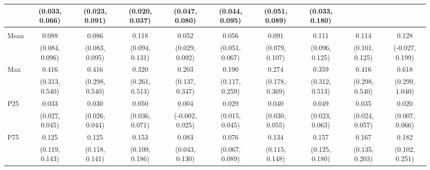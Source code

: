 {\begin{tabular}{l|c|c|c|c|c|c|c|c|c}
& {\scriptsize (0.033, 0.066)}
& {\scriptsize (0.023, 0.091)}
& {\scriptsize (0.020, 0.037)}
& {\scriptsize (0.047, 0.080)}
& {\scriptsize (0.044, 0.095)}
& {\scriptsize (0.051, 0.089)}
& {\scriptsize (0.033, 0.180)}
\\ [0.1cm]
\hline
\noalign{\smallskip}
\multicolumn{10}{l}{\textbf{Effect with Leads and Lags}} \\
\noalign{\smallskip}
\hline
Mean
& 0.088 & 0.086 & 0.118 & 0.052 & 0.056 & 0.091 & 0.111 & 0.114 & 0.128 \\
& {\scriptsize (0.084, 0.096)}
& {\scriptsize (0.083, 0.095)}
& {\scriptsize (0.094, 0.131)}
& {\scriptsize (0.029, 0.092)}
& {\scriptsize (0.051, 0.067)}
& {\scriptsize (0.079, 0.107)}
& {\scriptsize (0.096, 0.125)}
& {\scriptsize (0.101, 0.125)}
& {\scriptsize (-0.027, 0.199)}
\\ [0.1cm]
\hline
Max
& 0.416 & 0.416 & 0.320 & 0.203 & 0.190 & 0.274 & 0.359 & 0.416 & 0.618 \\
& {\scriptsize (0.313, 0.540)}
& {\scriptsize (0.298, 0.540)}
& {\scriptsize (0.261, 0.513)}
& {\scriptsize (0.137, 0.347)}
& {\scriptsize (0.117, 0.259)}
& {\scriptsize (0.178, 0.369)}
& {\scriptsize (0.312, 0.513)}
& {\scriptsize (0.298, 0.540)}
& {\scriptsize (0.299, 1.040)}
\\ [0.1cm]
\hline
P25
& 0.033 & 0.030 & 0.050 & 0.004 & 0.029 & 0.040 & 0.049 & 0.035 & 0.020 \\
& {\scriptsize (0.027, 0.045)}
& {\scriptsize (0.026, 0.044)}
& {\scriptsize (0.036, 0.071)}
& {\scriptsize (-0.002, 0.025)}
& {\scriptsize (0.015, 0.045)}
& {\scriptsize (0.030, 0.055)}
& {\scriptsize (0.023, 0.063)}
& {\scriptsize (0.024, 0.057)}
& {\scriptsize (0.007, 0.066)}
\\ [0.1cm]
\hline
P75
& 0.125 & 0.125 & 0.153 & 0.083 & 0.076 & 0.134 & 0.157 & 0.167 & 0.182 \\
& {\scriptsize (0.119, 0.143)}
& {\scriptsize (0.118, 0.141)}
& {\scriptsize (0.109, 0.186)}
& {\scriptsize (0.043, 0.130)}
& {\scriptsize (0.067, 0.089)}
& {\scriptsize (0.115, 0.148)}
& {\scriptsize (0.125, 0.180)}
& {\scriptsize (0.135, 0.203)}
& {\scriptsize (0.102, 0.251)}
\\ [0.1cm]
\hline
\hline
\end{tabular}
}

